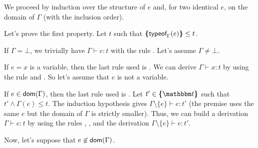 \documentclass[a4paper]{article}
\theoremstyle{definition}
\begin{document}
  We proceed by induction over the structure of $e$
  and, for two identical $e$, on the domain of $\Gamma$ (with the inclusion order).

  Let's prove the first property.
  Let $t$ such that $\textbf{\textup{\{}}\textsf{typeof}_{\Gamma}(e)\textbf{\textup{\}}} \leq t$.

  If $\Gamma = \bot$, we trivially have $\Gamma \vdash e:t$ with the rule .
  Let's assume $\Gamma \neq \bot$.

  If $e=x$ is a variable, then the last rule used is .
  We can derive $\Gamma \vdash x:t$ by using the rule  and .
  So let's assume that $e$ is not a variable.

  If $e\in\textsf{dom}(\Gamma)$, then the last rule used is .
  Let $t'\in\tsint{\ts}$ such that $t'\land\Gamma(e)\leq t$.
  The induction hypothesis gives $\Gamma\setminus\{e\} \vdash e:t'$
  (the premise uses the same $e$ but the domain of $\Gamma$ is strictly smaller).
  Thus, we can build a derivation $\Gamma \vdash e:t$ by using the rules , ,
   and the derivation $\Gamma\setminus\{e\} \vdash e:t'$.

  Now, let's suppose that $e\not\in\textsf{dom}(\Gamma)$.
\end{document}

